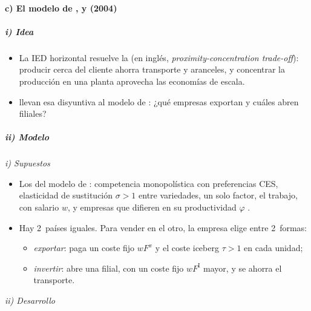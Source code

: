 \documentclass[11pt]{article}
\begin{document}
\paragraph{c) El modelo de ,  y  (2004)}

\subparagraph{i) Idea}

\begin{itemize}
\item La IED horizontal resuelve la  (en inglés, \emph{proximity-concentration trade-off}): producir cerca del cliente ahorra transporte y aranceles, y concentrar la producción en una planta aprovecha las economías de escala\nocite{HorstmannMarkusen1992Endogenous,Brainard1997}.
\item \textcite{HelpmanMelitzYeaple2004Export} llevan esa disyuntiva al modelo de : ¿qué empresas exportan y cuáles abren filiales? 
\end{itemize}

\subparagraph{ii) Modelo}

\hspace*{3.6em}\emph{i) Supuestos}

\begin{itemize}
\item Los del modelo de : competencia monopolística con preferencias CES, elasticidad de sustitución $\sigma>1$ entre variedades, un solo factor, el trabajo, con salario $w$, y empresas que difieren en su productividad $\varphi$ .
\item Hay 2~países iguales. Para vender en el otro, la empresa elige entre 2~formas:
  \begin{itemize}
  \item \emph{exportar}: paga un coste fijo $wF^x$ y el coste iceberg $\tau>1$ en cada unidad;
  \item \emph{invertir}: abre una filial, con un coste fijo $wF^{\mathrm I}$ mayor, y se ahorra el transporte.
  \end{itemize}
\end{itemize}

\hspace*{3.6em}\emph{ii) Desarrollo}
\end{document}
